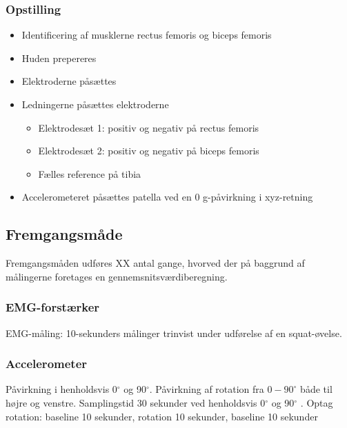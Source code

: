 \subsubsection{Opstilling}
\begin{itemize}
\item Identificering af musklerne rectus femoris og biceps femoris 
\item Huden prepereres
\item Elektroderne påsættes
\item Ledningerne påsættes elektroderne
	\begin{itemize}
	\item Elektrodesæt 1: positiv og negativ på rectus femoris
	\item Elektrodesæt 2: positiv og negativ på biceps femoris
	\item Fælles reference på tibia
	\end{itemize} 
\item Accelerometeret påsættes patella ved en 0 g-påvirkning i xyz-retning
\end{itemize}


\subsection{Fremgangsmåde}
Fremgangsmåden udføres XX antal gange, hvorved der på baggrund af målingerne foretages en gennemsnitsværdiberegning.

\subsubsection{EMG-forstærker}
EMG-måling: 10-sekunders målinger trinvist under udførelse af en squat-øvelse. 


\subsubsection{Accelerometer}
Påvirkning i henholdsvis 0$^{\circ}$ og 90$^{\circ}$.
Påvirkning af rotation fra $0-90^{\circ}$ både til højre og venstre.
Samplingstid 30 sekunder ved henholdsvis 0$^{\circ}$ og 90$^{\circ}$ .
Optag rotation: baseline 10 sekunder, rotation 10 sekunder, baseline 10 sekunder %


